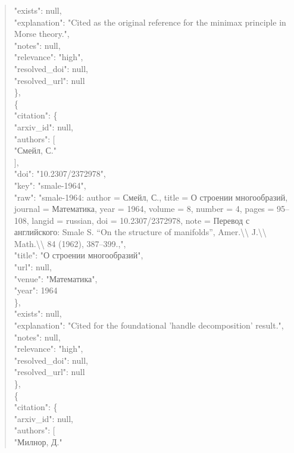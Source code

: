 \documentclass[11pt]{article}
\begin{document}
\begin{quote}
      "exists": null,\\
      "explanation": "Cited as the original reference for the minimax principle in Morse theory.",\\
      "notes": null,\\
      "relevance": "high",\\
      "resolved\_doi": null,\\
      "resolved\_url": null\\
    \},\\
    \{\\
      "citation": \{\\
        "arxiv\_id": null,\\
        "authors": [\\
          "Смейл, С."\\
        ],\\
        "doi": "10.2307/2372978",\\
        "key": "smale-1964",\\
        "raw": "smale-1964: author = Смейл, С., title = О строении многообразий, journal = Математика, year = 1964, volume = 8, number = 4, pages = 95--108, langid = russian, doi = 10.2307/2372978, note = Перевод с английского: Smale S. ``On the structure of manifolds'', Amer.\textbackslash{}\textbackslash{} J.\textbackslash{}\textbackslash{} Math.\textbackslash{}\textbackslash{} 84 (1962), 387--399.,",\\
        "title": "О строении многообразий",\\
        "url": null,\\
        "venue": "Математика",\\
        "year": 1964\\
      \},\\
      "exists": null,\\
      "explanation": "Cited for the foundational 'handle decomposition' result.",\\
      "notes": null,\\
      "relevance": "high",\\
      "resolved\_doi": null,\\
      "resolved\_url": null\\
    \},\\
    \{\\
      "citation": \{\\
        "arxiv\_id": null,\\
        "authors": [\\
          "Милнор, Д."\\

\end{quote}
\end{document}
